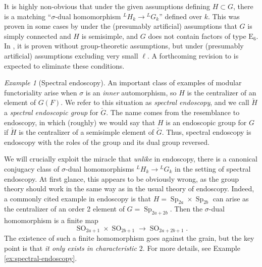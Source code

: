 \documentclass[reqno]{amsart}
\numberwithin{equation}{subsection}
\newcommand{\ld}{{}^L}
\DeclareMathOperator{\Sp}{Sp}
\DeclareMathOperator{\SO}{SO}
\newcommand{\chG}{\check{G}}
\newcommand{\chH}{\check{H}}
\theoremstyle{remark}
\newtheorem{example}[thm]{Example}
\numberwithin{equation}{subsection}
\numberwithin{figure}{subsection}
\begin{document}
It is highly non-obvious that under the given assumptions defining $H \subset G$, there is a matching ``$\sigma$-dual homomorphism $\ld H_k \rightarrow \ld G_k$'' defined over $k$. This was proven in some cases by \cite{TV} under the (presumably artificial) assumptions that $G$ is simply connected and $H$ is semisimple, and $G$ does not contain factors of type $\mathrm{E}_6$. In \cite{F24}, it is proven without group-theoretic assumptions, but under (presumably artificial) assumptions excluding very small $\ell$. A forthcoming revision to \cite{F24} is expected to eliminate these conditions. 


\begin{example}[Spectral endoscopy] An important class of examples of modular functoriality arise when $\sigma$ is an \emph{inner} automorphism, so $H$ is the centralizer of an element of $G(F)$. We refer to this situation as \emph{spectral endoscopy}, and we call $\chH$ a \emph{spectral endoscopic group} for $\chG$. The name comes from the resemblance to endoscopy, in which (roughly) we would say that $H$ is an endoscopic group for $G$ if $\chH$ is the centralizer of a semisimple element of $\chG$. Thus, spectral endoscopy is endoscopy with the roles of the group and its dual group reversed.

We will crucially exploit the miracle that \emph{unlike} in endoscopy, there is a canonical conjugacy class of $\sigma$-dual homomorphisms $\ld H_k \rightarrow \ld G_k$ in the setting of spectral endoscopy. At first glance, this appears to be obviously wrong, as the group theory should work in the same way as in the usual theory of endoscopy. Indeed, a commonly cited example in endoscopy is that $H = \Sp_{2a} \times \Sp_{2b}$ can arise as the centralizer of an order 2 element of $G = \Sp_{2a+2b}$. Then the $\sigma$-dual homomorphism is a finite map 
\[
\SO_{2a+1} \times \SO_{2b+1} \rightarrow \SO_{2a+2b+1}.
\]
The existence of such a finite homomorphism goes against the grain, but the key point is that \emph{it only exists in characteristic $2$}. For more details, see Example \ref{ex:spectral-endoscopy}.
\end{example}
\end{document}

